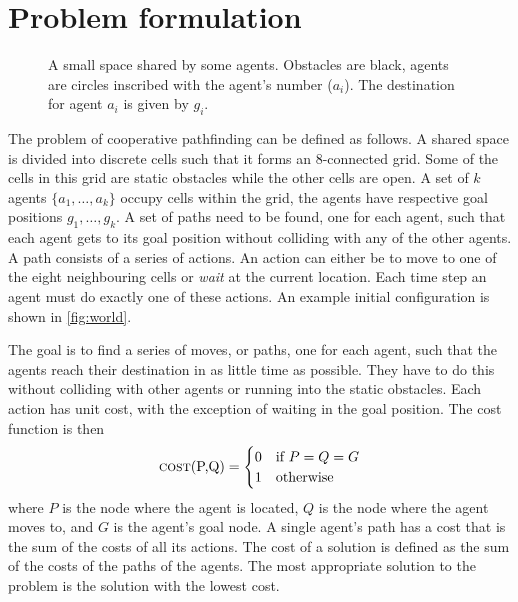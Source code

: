 \section{Problem formulation}\label{sec:problem}

\begin{figure}[t]
    \centering
    \def\svgscale{.7}
    
    \caption{A small space shared by some agents. Obstacles are black, agents
        are circles inscribed with the agent's number ($a_i$). The destination
        for agent $a_i$ is given by $g_i$.}
    \label{fig:world}
\end{figure}

The problem of cooperative pathfinding can be defined as follows. A shared
space is divided into discrete cells such that it forms an 8-connected grid.
Some of the cells in this grid are static obstacles while the other cells are
open. A set of $k$ agents $\{a_1, \ldots, a_k\}$ occupy cells within the grid,
the agents have respective goal positions $g_1, \ldots, g_k$. A set of paths
need to be found, one for each agent, such that each agent gets to its goal
position without colliding with any of the other agents. A path consists of a
series of actions. An action can either be to move to one of the eight
neighbouring cells or \emph{wait} at the current location. Each time step an
agent must do exactly one of these actions. An example initial configuration is
shown in \autoref{fig:world}.

The goal is to find a series of moves, or paths, one for each agent, such that
the agents reach their destination in as little time as possible. They have to
do this without colliding with other agents or running into the static
obstacles. Each action has unit cost, with the exception of waiting in the goal
position. The cost function is then
\[
\text{\textsc{cost}(P,Q)} =
\begin{cases}
    0 & \text{if } P = Q = G \\
    1 & \text{otherwise}
\end{cases}
\]
where $P$ is the node where the agent is located, $Q$ is the node where the
agent moves to, and $G$ is the agent's goal node. A single agent's path has a
cost that is the sum of the costs of all its actions. The cost of a solution is
defined as the sum of the costs of the paths of the agents. The most
appropriate solution to the problem is the solution with the lowest cost.

